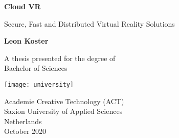 \begin{titlepage}
   \begin{center}
       \vspace*{1cm}

       \textbf{Cloud VR}

       \vspace{0.5cm}
        Secure, Fast and Distributed Virtual Reality Solutions
            
       \vspace{1.5cm}

       \textbf{Leon Koster}

       \vfill
            
       A thesis presented for the degree of\\
       Bachelor of Sciences
            
       \vspace{0.8cm}
     
      \texttt{[image: university]}
            
       Academie Creative Technology (ACT)\\
       Saxion University of Applied Sciences\\
       Netherlands\\
       October 2020
            
   \end{center}
\end{titlepage}